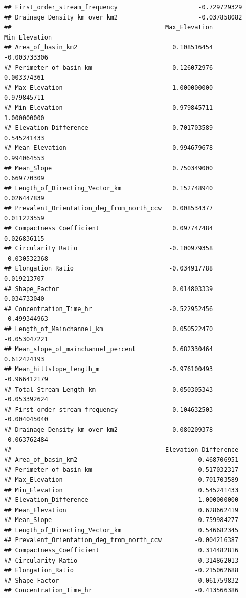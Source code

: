 \documentclass[11pt,]{article}
\begin{document}
\begin{verbatim}
## First_order_stream_frequency                      -0.729729329
## Drainage_Density_km_over_km2                      -0.037858082
##                                          Max_Elevation Min_Elevation
## Area_of_basin_km2                          0.108516454  -0.003733306
## Perimeter_of_basin_km                      0.126072976   0.003374361
## Max_Elevation                              1.000000000   0.979845711
## Min_Elevation                              0.979845711   1.000000000
## Elevation_Difference                       0.701703589   0.545241433
## Mean_Elevation                             0.994679678   0.994064553
## Mean_Slope                                 0.750349000   0.669770309
## Length_of_Directing_Vector_km              0.152748940   0.026447839
## Prevalent_Orientation_deg_from_north_ccw   0.008534377   0.011223559
## Compactness_Coefficient                    0.097747484   0.026836115
## Circularity_Ratio                         -0.100979358  -0.030532368
## Elongation_Ratio                          -0.034917788   0.019213707
## Shape_Factor                               0.014803339   0.034733040
## Concentration_Time_hr                     -0.522952456  -0.499344963
## Length_of_Mainchannel_km                   0.050522470  -0.053047221
## Mean_slope_of_mainchannel_percent          0.682330464   0.612424193
## Mean_hillslope_length_m                   -0.976100493  -0.966412179
## Total_Stream_Length_km                     0.050305343  -0.053392624
## First_order_stream_frequency              -0.104632503  -0.004045040
## Drainage_Density_km_over_km2              -0.080209378  -0.063762484
##                                          Elevation_Difference
## Area_of_basin_km2                                 0.468706951
## Perimeter_of_basin_km                             0.517032317
## Max_Elevation                                     0.701703589
## Min_Elevation                                     0.545241433
## Elevation_Difference                              1.000000000
## Mean_Elevation                                    0.628662419
## Mean_Slope                                        0.759984277
## Length_of_Directing_Vector_km                     0.546682345
## Prevalent_Orientation_deg_from_north_ccw         -0.004216387
## Compactness_Coefficient                           0.314482816
## Circularity_Ratio                                -0.314862013
## Elongation_Ratio                                 -0.215062688
## Shape_Factor                                     -0.061759832
## Concentration_Time_hr                            -0.413566386

\end{verbatim}
\end{document}

